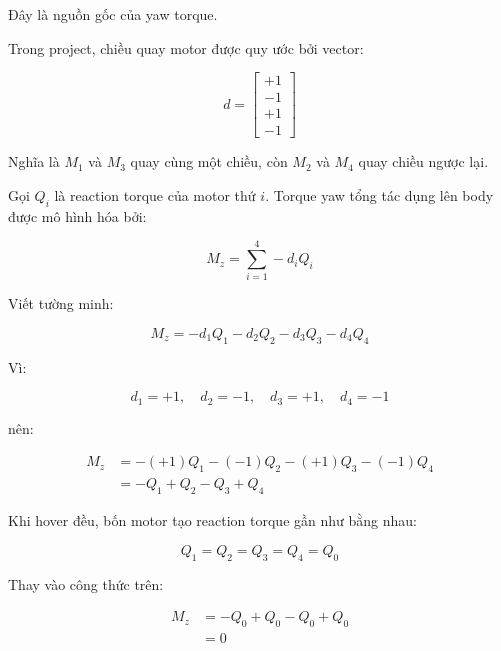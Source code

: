 Đây là nguồn gốc của yaw torque.

Trong project, chiều quay motor được quy ước bởi vector:

\begin{equation}
    d =
    \begin{bmatrix}
        +1\\
        -1\\
        +1\\
        -1
    \end{bmatrix}
\end{equation}

Nghĩa là $M_1$ và $M_3$ quay cùng một chiều, còn $M_2$ và $M_4$ quay chiều
ngược lại.

Gọi $Q_i$ là reaction torque của motor thứ $i$. Torque yaw tổng tác dụng lên
body được mô hình hóa bởi:

\begin{equation}
    M_z
    =
    \sum_{i=1}^{4} -d_iQ_i
\end{equation}

Viết tường minh:

\begin{equation}
    M_z
    =
    -d_1Q_1
    -d_2Q_2
    -d_3Q_3
    -d_4Q_4
\end{equation}

Vì:

\begin{equation}
    d_1=+1,\quad
    d_2=-1,\quad
    d_3=+1,\quad
    d_4=-1
\end{equation}

nên:

\begin{equation}
\begin{aligned}
    M_z
    &=
    -(+1)Q_1
    -(-1)Q_2
    -(+1)Q_3
    -(-1)Q_4\\
    &=
    -Q_1 + Q_2 - Q_3 + Q_4
\end{aligned}
\end{equation}

Khi hover đều, bốn motor tạo reaction torque gần như bằng nhau:

\begin{equation}
    Q_1 = Q_2 = Q_3 = Q_4 = Q_0
\end{equation}

Thay vào công thức trên:

\begin{equation}
\begin{aligned}
    M_z
    &=
    -Q_0 + Q_0 - Q_0 + Q_0\\
    &=
    0
\end{aligned}
\end{equation}

